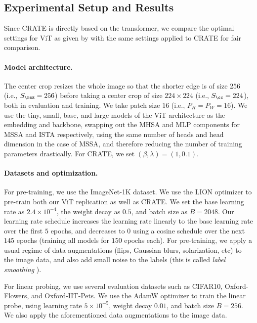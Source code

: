 \documentclass[../../book-main.tex]{subfiles}
\begin{document}
\subsection{Experimental Setup and Results}\label{sub:image_classification_experiments}

Since CRATE is directly based on the transformer, we compare the optimal settings for ViT as given by \cite{dosovitskiy2020image,touvron2020training} with the same settings applied to CRATE for fair comparison.

\paragraph{Model architecture.} The center crop resizes the whole image so that the shorter edge is of size \(256\) (i.e., \(S_{\rsz} = 256\)) before taking a center crop of size \(224 \times 224\) (i.e., \(S_{\cc} = 224\)), both in evaluation and training. We take patch size \(16\) (i.e., \(P_{H} = P_{W} = 16\)). We use the tiny, small, base, and large models of the ViT \cite{dosovitskiy2020image} architecture as the embedding and backbone, swapping out the MHSA and MLP components for MSSA and ISTA respectively, using the same number of heads and head dimension in the case of MSSA, and therefore reducing the number of training parameters drastically. For CRATE, we set \((\beta, \lambda) = (1, 0.1)\).

\paragraph{Datasets and optimization.} For pre-training, we use the ImageNet-1K dataset. We use the LION optimizer \citep{chen2024symbolic} to pre-train both our ViT replication as well as CRATE. We set the base learning rate as \(2.4 \times 10^{-4}\), the weight decay as \(0.5\), and batch size as \(B = 2048\). Our learning rate schedule increases the learning rate linearly to the base learning rate over the first \(5\) epochs, and decreases to \(0\) using a cosine schedule over the next \(145\) epochs (training all models for \(150\) epochs each). For pre-training, we apply a usual regime of data augmentations (flips, Gaussian blurs, solarization, etc) to the image data, and also add small noise to the labels (this is called \textit{label smoothing} \citep{muller2019does}).

For linear probing, we use several evaluation datasets such as CIFAR10, Oxford-Flowers, and Oxford-IIT-Pets. We use the AdamW optimizer to train the linear probe, using learning rate \(5 \times 10^{-5}\), weight decay \(0.01\), and batch size \(B = 256\). We also apply the aforementioned data augmentations to the image data.
\end{document}
